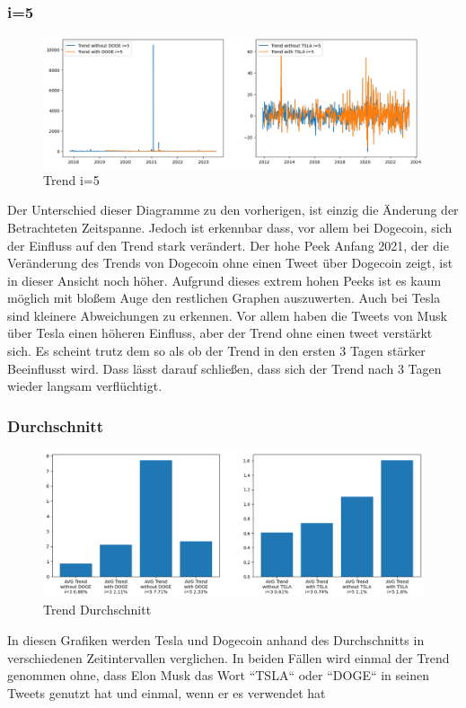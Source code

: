 \documentclass{article}
\begin{document}
\subsubsection{i=5}
\begin{figure}[!htb]
  	\includegraphics[width=\textwidth, center]{../imgs/Trendi5.png}
 	\caption{Trend i=5}
 	\label{fig:Trendi5}
\end{figure}
Der Unterschied dieser Diagramme zu den vorherigen, ist einzig die Änderung der Betrachteten Zeitspanne. Jedoch ist erkennbar dass, vor allem bei Dogecoin, sich der Einfluss auf den Trend stark verändert. Der hohe Peek Anfang 2021, der die Veränderung des Trends von Dogecoin ohne einen Tweet über Dogecoin zeigt, ist in dieser Ansicht noch höher. Aufgrund dieses extrem hohen Peeks ist es kaum möglich mit bloßem Auge den restlichen Graphen auszuwerten. Auch bei Tesla sind kleinere Abweichungen zu erkennen. Vor allem haben die Tweets von Musk über Tesla einen höheren Einfluss, aber der Trend ohne einen tweet verstärkt sich. Es scheint trutz dem so als ob der Trend in den ersten 3 Tagen stärker Beeinflusst wird. Dass lässt darauf schließen, dass sich der Trend nach 3 Tagen wieder langsam verflüchtigt.


\subsubsection{Durchschnitt}
\begin{figure}[!htb]
  	\includegraphics[width=\textwidth, center]{../imgs/Trend_Durchschnitt.png}
 	\caption{Trend Durchschnitt}
 	\label{fig:Trend Durchschnitt}
\end{figure}
In diesen Grafiken werden Tesla und Dogecoin anhand des Durchschnitts in verschiedenen Zeitintervallen verglichen. In beiden Fällen wird einmal der Trend genommen ohne, dass Elon Musk das Wort “TSLA“ oder “DOGE“ in seinen Tweets genutzt hat und einmal, wenn er es verwendet hat
\end{document}
